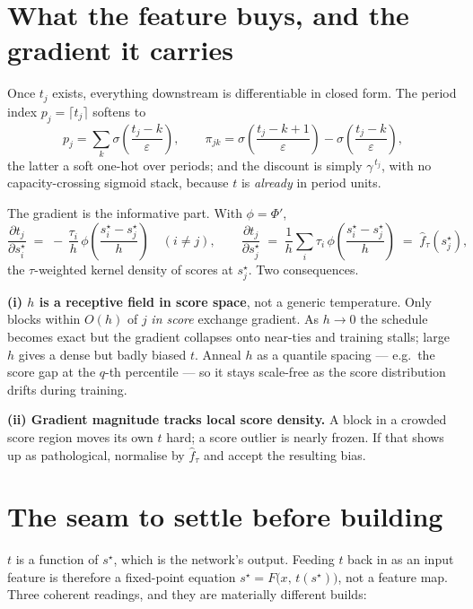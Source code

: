 \documentclass[11pt,a4paper]{article}
\newcommand{\sstar}{s^{\star}}
\theoremstyle{definition}
\begin{document}
\section{What the feature buys, and the gradient it carries}

Once $t_j$ exists, everything downstream is differentiable in closed form. The period index
$p_j = \lceil t_j \rceil$ softens to
\[
  p_j = \sum_k \sigma\!\left(\frac{t_j - k}{\varepsilon}\right),
  \qquad
  \pi_{jk} = \sigma\!\left(\frac{t_j - k + 1}{\varepsilon}\right) - \sigma\!\left(\frac{t_j-k}{\varepsilon}\right),
\]
the latter a soft one-hot over periods; and the discount is simply $\gamma^{\,t_j}$, with no
capacity-crossing sigmoid stack, because $t$ is \emph{already} in period units.

The gradient is the informative part. With $\phi = \Phi'$,
\[
  \frac{\partial t_j}{\partial \sstar_i}
  \;=\; -\,\frac{\tau_i}{h}\,\phi\!\left(\frac{\sstar_i - \sstar_j}{h}\right)
  \quad (i \ne j),
  \qquad
  \frac{\partial t_j}{\partial \sstar_j}
  \;=\; \frac{1}{h}\sum_i \tau_i\,\phi\!\left(\frac{\sstar_i - \sstar_j}{h}\right)
  \;=\; \hat f_\tau\!\left(\sstar_j\right),
\]
the $\tau$-weighted kernel density of scores at $\sstar_j$. Two consequences.

\medskip
\noindent\textbf{(i) $h$ is a receptive field in score space}, not a generic temperature. Only
blocks within $O(h)$ of $j$ \emph{in score} exchange gradient. As $h \to 0$ the schedule becomes
exact but the gradient collapses onto near-ties and training stalls; large $h$ gives a dense but
badly biased $t$. Anneal $h$ as a quantile spacing --- e.g.\ the score gap at the $q$-th
percentile --- so it stays scale-free as the score distribution drifts during training.

\medskip
\noindent\textbf{(ii) Gradient magnitude tracks local score density.} A block in a crowded score
region moves its own $t$ hard; a score outlier is nearly frozen. If that shows up as pathological,
normalise by $\hat f_\tau$ and accept the resulting bias.

\section{The seam to settle before building}

$t$ is a function of $\sstar$, which is the network's output. Feeding $t$ back in as an input
feature is therefore a fixed-point equation $\sstar = F\big(x,\, t(\sstar)\big)$, not a feature
map. Three coherent readings, and they are materially different builds:
\end{document}
